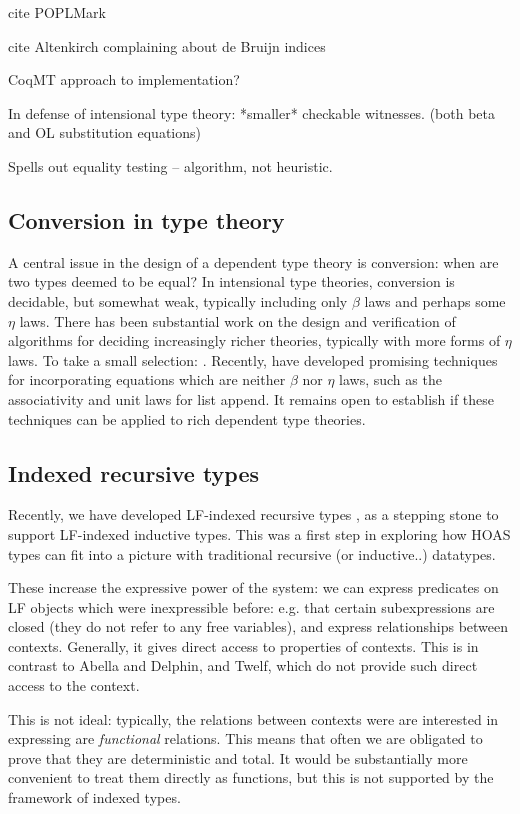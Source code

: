 \documentclass{article}
\begin{document}
cite POPLMark \cite{POPLMark}

cite Altenkirch complaining about de Bruijn indices

CoqMT approach to implementation?

In defense of intensional type theory: *smaller* checkable
witnesses. (both beta and OL substitution equations)

Spells out equality testing -- algorithm, not heuristic.

\subsection{Conversion in type theory}
A central issue in the design of a dependent type theory is
conversion: when are two types deemed to be equal? In
intensional type theories, conversion is decidable, but somewhat
weak, typically including only $\beta$ laws and perhaps some $\eta$
laws. There has been substantial work on the design and verification
of algorithms for deciding increasingly richer theories, typically
with more forms of $\eta$ laws. To take a
small selection: \cite{Coquand91,Harper05,Abel11}. Recently,
\cite{Allais13} have developed promising techniques for incorporating equations
which are neither $\beta$ nor $\eta$ laws, such as the associativity
and unit laws for list append. It remains open to establish if 
these techniques can be applied to rich dependent type theories.

\subsection{Indexed recursive types}
Recently, we have developed LF-indexed recursive types
\citep{Cave12}, as a stepping stone to support LF-indexed inductive
types. This was a first step in exploring how HOAS types can fit
into a picture with traditional recursive (or inductive..) datatypes. 

These increase the expressive power of the system: we can express
predicates on LF objects which were inexpressible before: e.g. that
certain subexpressions are closed (they do not refer to any free variables), and express relationships between
contexts. Generally, it gives direct access to properties of
contexts. This is in contrast to Abella and Delphin, and Twelf, which do not
provide such direct access to the context.

This is not ideal: typically, the relations between contexts were are
interested in expressing are \emph{functional} relations. This means
that often we are obligated to prove that they are deterministic and
total. It would be substantially more convenient to treat them
directly as functions, but this is not supported by the framework of
indexed types. 
\end{document}
